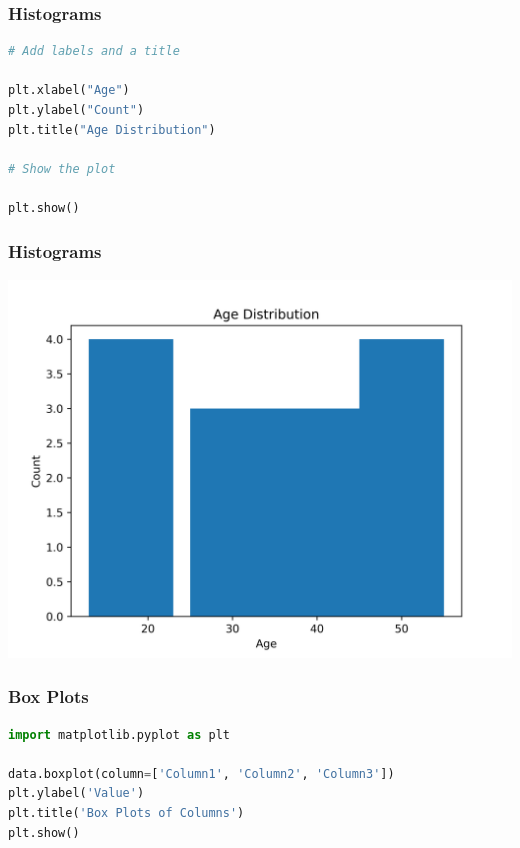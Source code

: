 \documentclass{beamer}
\begin{document}
    \begin{frame}[fragile]
        \frametitle{Histograms}
        \begin{lstlisting}[language=Python]
# Add labels and a title

plt.xlabel("Age")
plt.ylabel("Count")
plt.title("Age Distribution")

# Show the plot

plt.show()
        \end{lstlisting}
    \end{frame}

    \begin{frame}
        \frametitle{Histograms}
        \begin{center}
            \includegraphics[width=0.7\linewidth]{figures/histogram_example_custom}
        \end{center}
    \end{frame}

    \begin{frame}[fragile]
        \frametitle{Box Plots}
        \begin{lstlisting}[language=Python]
import matplotlib.pyplot as plt

data.boxplot(column=['Column1', 'Column2', 'Column3'])
plt.ylabel('Value')
plt.title('Box Plots of Columns')
plt.show()
        \end{lstlisting}
    \end{frame}
\end{document}
